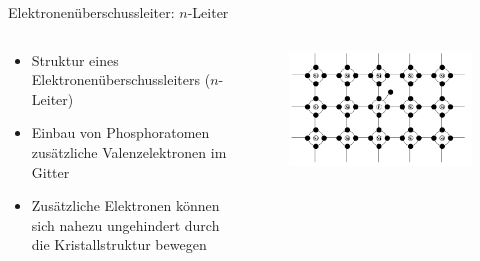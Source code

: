 \documentclass[12pt%
,aspectratio=169%
]{beamer}
\begin{document}
\begin{frame}{Elektronenüberschussleiter: $n$-Leiter}
\begin{columns}[T] %
\begin{column}{.48\textwidth}
\begin{itemize}
	\item Struktur eines Elektronenüberschussleiters ($n$-Leiter)
	\item Einbau von Phosphoratomen zusätzliche Valenzelektronen im Gitter
	\item Zusätzliche Elektronen können sich nahezu ungehindert durch die Kristallstruktur bewegen
\end{itemize}
\end{column}%
\hfill%
\begin{column}{.48\textwidth}
\begin{figure}
\center
\includegraphics[scale=0.3]{pictures/n_leiter}
\end{figure}
\end{column}%
\end{columns}
\end{frame}
\end{document}

